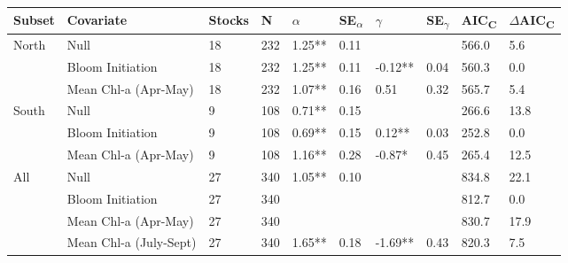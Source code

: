 \begin{tabular}{llllllllll}
  \hline
Subset & Covariate & Stocks & N & $\alpha$ & SE\textsubscript{$\alpha$} & $\gamma$ & SE\textsubscript{$\gamma$} & AIC\textsubscript{C} & $\Delta$AIC\textsubscript{C} \\ 
  \hline
North & Null & 18 & 232 & 1.25** & 0.11 &  &  & 566.0 & 5.6 \\ 
   & Bloom Initiation & 18 & 232 & 1.25** & 0.11 & -0.12** & 0.04 & 560.3 & 0.0 \\ 
   & Mean Chl-a (Apr-May) & 18 & 232 & 1.07** & 0.16 & 0.51 & 0.32 & 565.7 & 5.4 \\ 
  South & Null & 9 & 108 & 0.71** & 0.15 &  &  & 266.6 & 13.8 \\ 
   & Bloom Initiation & 9 & 108 & 0.69** & 0.15 & 0.12** & 0.03 & 252.8 & 0.0 \\ 
   & Mean Chl-a (Apr-May) & 9 & 108 & 1.16** & 0.28 & -0.87* & 0.45 & 265.4 & 12.5 \\ 
  All & Null & 27 & 340 & 1.05** & 0.10 &  &  & 834.8 & 22.1 \\ 
   & Bloom Initiation & 27 & 340 &  &  &  &  & 812.7 & 0.0 \\ 
   & Mean Chl-a (Apr-May) & 27 & 340 &  &  &  &  & 830.7 & 17.9 \\ 
   & Mean Chl-a (July-Sept) & 27 & 340 & 1.65** & 0.18 & -1.69** & 0.43 & 820.3 & 7.5 \\ 
   \hline
\end{tabular}
